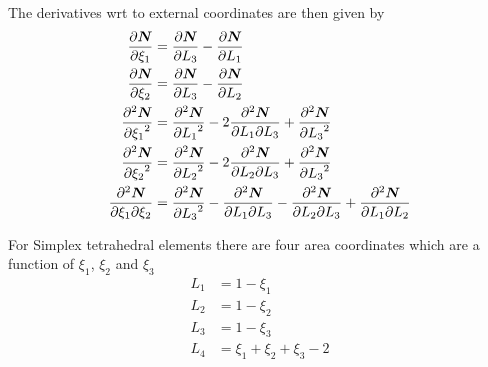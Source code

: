 The derivatives wrt to external coordinates are then given by 
\begin{align}
  \delby{\vect{\sbfnsymb{}}}{\xi_{1}} &= \delby{\vect{\sbfnsymb{}}}{L_{3}}-\delby{\vect{\sbfnsymb{}}}{L_{1}} \\
  \delby{\vect{\sbfnsymb{}}}{\xi_{2}} &= \delby{\vect{\sbfnsymb{}}}{L_{3}}-\delby{\vect{\sbfnsymb{}}}{L_{2}} \\
  \deltwosqby{\vect{\sbfnsymb{}}}{\xi_{1}} &= \deltwosqby{\vect{\sbfnsymb{}}}{L_{1}}- 
  2\deltwoby{\vect{\sbfnsymb{}}}{L_{1}}{L_{3}}+\deltwosqby{\vect{\sbfnsymb{}}}{L_{3}} \\
  \deltwosqby{\vect{\sbfnsymb{}}}{\xi_{2}} &= \deltwosqby{\vect{\sbfnsymb{}}}{L_{2}}- 
  2\deltwoby{\vect{\sbfnsymb{}}}{L_{2}}{L_{3}}+\deltwosqby{\vect{\sbfnsymb{}}}{L_{3}} \\
  \deltwoby{\vect{\sbfnsymb{}}}{\xi_{1}}{\xi_{2}} &= \deltwosqby{\vect{\sbfnsymb{}}}{L_{3}}-
  \deltwoby{\vect{\sbfnsymb{}}}{L_{1}}{L_{3}}-\deltwoby{\vect{\sbfnsymb{}}}{L_{2}}{L_{3}}+
  \deltwoby{\vect{\sbfnsymb{}}}{L_{1}}{L_{2}}
\end{align}
  
For Simplex tetrahedral elements there are four area coordinates which are a
function of $\xi_{1}$, $\xi_{2}$ and $\xi_{3}$ \ie
\begin{align}
  L_{1} &= 1 - \xi_{1} \\
  L_{2} &= 1 - \xi_{2} \\
  L_{3} &= 1 - \xi_{3} \\
  L_{4} &= \xi_{1} + \xi_{2} + \xi_{3} - 2
\end{align}

